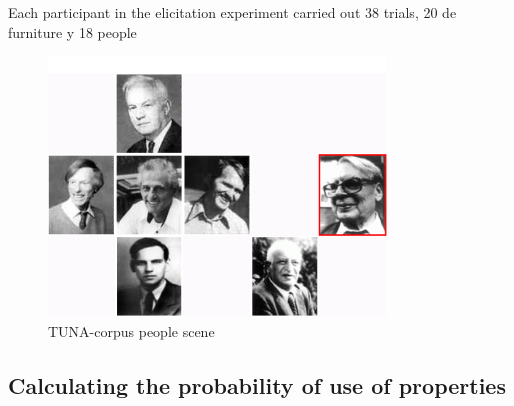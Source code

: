 Each participant in the elicitation experiment carried out 38 trials, 20 de furniture y 18 people 


\begin{figure}[ht]
\centering
\includegraphics[width=0.8\textwidth]{images/tuna-people.jpg}

\caption{TUNA-corpus people scene}
\label{Tuna-people-scene}
\centering

\end{figure}

\subsection{Calculating the probability of use of properties}\label{calculate}

